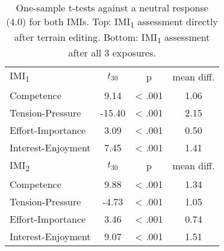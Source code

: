 \begin{table}[t!]

    \centering
    \caption{One-sample t-tests against a neutral response (4.0) for both IMIs. 
    Top: IMI\textsubscript{1} assessment directly after terrain editing. Bottom: IMI\textsubscript{1} assessment after all 3 exposures.}
    \begin{tabular}{lccc}
    IMI\textsubscript{1}                    & $t_{30}$ & p      & mean diff. \\ \cline{2-4} 
    \multicolumn{1}{l|}{Competence}         & 9.14     & < .001 & 1.06       \\
    \multicolumn{1}{l|}{Tension-Pressure}   & -15.40   & < .001 & \text{-}2.15\\
    \multicolumn{1}{l|}{Effort-Importance}  & 3.09     & < .001 & 0.50       \\
    \multicolumn{1}{l|}{Interest-Enjoyment} & 7.45     & < .001 & 1.41       \\
    \midrule
    IMI\textsubscript{2}                    & $t_{30}$ & p      & mean diff. \\ \cline{2-4} 
    \multicolumn{1}{l|}{Competence}         & 9.88     & < .001 & 1.34       \\
    \multicolumn{1}{l|}{Tension-Pressure}   & -4.73    & < .001 & \text{-}1.05\\
    \multicolumn{1}{l|}{Effort-Importance}  & 3.46     & < .001 & 0.74       \\
    \multicolumn{1}{l|}{Interest-Enjoyment} & 9.07     & < .001 & 1.51       \\
    \end{tabular}%
    \label{tab:imi_one_sample_ttests}
\end{table}{}